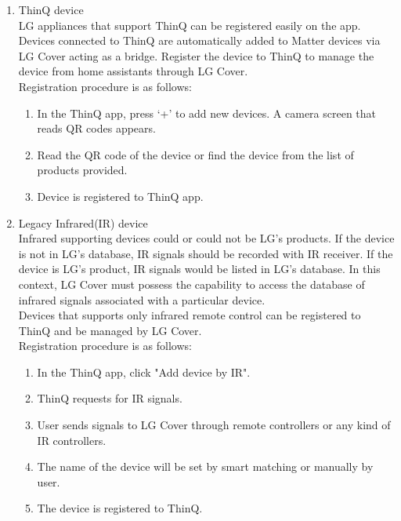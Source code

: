 \documentclass[conference]{IEEEtran}
\begin{document}
\begin{enumerate}[label=\arabic*.]
\item {\large{ThinQ device}}\\
LG appliances that support ThinQ can be registered easily on the app.  Devices connected to ThinQ are automatically added to Matter devices via LG Cover acting as a bridge. Register the device to ThinQ to manage the device from home assistants through LG Cover.\\
Registration procedure is as follows:\\
\begin{enumerate}[label=\alph*.]
\item In the ThinQ app, press ‘+’ to add new devices. A camera screen that reads QR codes appears.\\
\item Read the QR code of the device or find the device from the list of products provided.\\
\item Device is registered to ThinQ app.\\
\end{enumerate}

\item {\large{Legacy Infrared(IR) device}}\\
Infrared supporting devices could or could not be LG’s products. If the device is not in LG’s database, IR signals should be recorded with IR receiver. If the device is LG’s product, IR signals would be listed in LG’s database. In this context, LG Cover must possess the capability to access the database of infrared signals associated with a particular device.\\
Devices that supports only infrared remote control can be registered to ThinQ and be managed by LG Cover.\\
Registration procedure is as follows:\\
\begin{enumerate}[label=\alph*.]
\item In the ThinQ app, click "Add device by IR". \\
\item ThinQ requests for IR signals.\\
\item User sends signals to LG Cover through remote controllers or any kind of IR controllers.\\
\item The name of the device will be set by smart matching or manually by user.\\
\item The device is registered to ThinQ.\\
\end{enumerate}
\end{enumerate}
\end{document}
